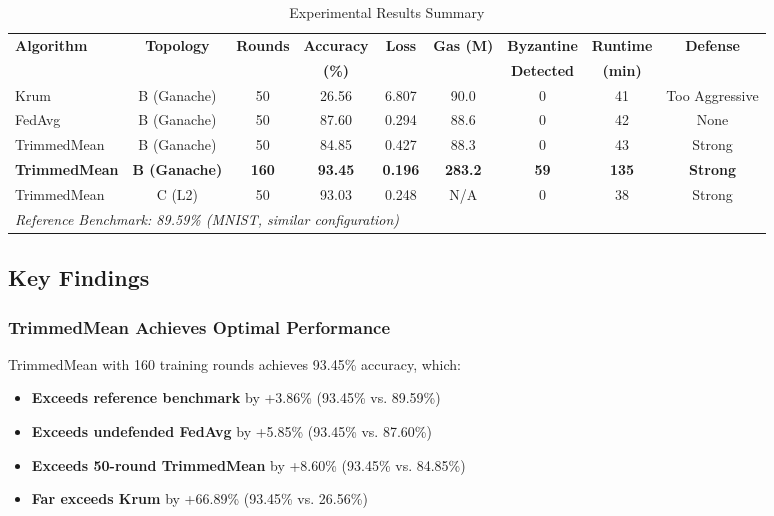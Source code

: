 \documentclass[12pt,a4paper,onecolumn]{article}
\begin{document}
\begin{table}[t]
\caption{Experimental Results Summary}
\label{tab:overall_results}
\centering
\begin{tabular}{lcccccccc}
\toprule
\textbf{Algorithm} & \textbf{Topology} & \textbf{Rounds} & \textbf{Accuracy} & \textbf{Loss} & \textbf{Gas (M)} & \textbf{Byzantine} & \textbf{Runtime} & \textbf{Defense} \\
& & & \textbf{(\%)} & & & \textbf{Detected} & \textbf{(min)} & \\
\midrule
Krum & B (Ganache) & 50 & 26.56 & 6.807 & 90.0 & 0 & 41 & Too Aggressive \\
FedAvg & B (Ganache) & 50 & 87.60 & 0.294 & 88.6 & 0 & 42 & None \\
TrimmedMean & B (Ganache) & 50 & 84.85 & 0.427 & 88.3 & 0 & 43 & Strong \\
\textbf{TrimmedMean} & \textbf{B (Ganache)} & \textbf{160} & \textbf{93.45} & \textbf{0.196} & \textbf{283.2} & \textbf{59} & \textbf{135} & \textbf{Strong} \\
TrimmedMean & C (L2) & 50 & 93.03 & 0.248 & N/A & 0 & 38 & Strong \\
\midrule
\multicolumn{9}{l}{\textit{Reference Benchmark: 89.59\% (MNIST, similar configuration)}} \\
\bottomrule
\end{tabular}
\end{table}

\subsection{Key Findings}

\subsubsection{TrimmedMean Achieves Optimal Performance}

TrimmedMean with 160 training rounds achieves 93.45\% accuracy, which:
\begin{itemize}
    \item \textbf{Exceeds reference benchmark} by +3.86\% (93.45\% vs. 89.59\%)
    \item \textbf{Exceeds undefended FedAvg} by +5.85\% (93.45\% vs. 87.60\%)
    \item \textbf{Exceeds 50-round TrimmedMean} by +8.60\% (93.45\% vs. 84.85\%)
    \item \textbf{Far exceeds Krum} by +66.89\% (93.45\% vs. 26.56\%)
\end{itemize}
\end{document}
